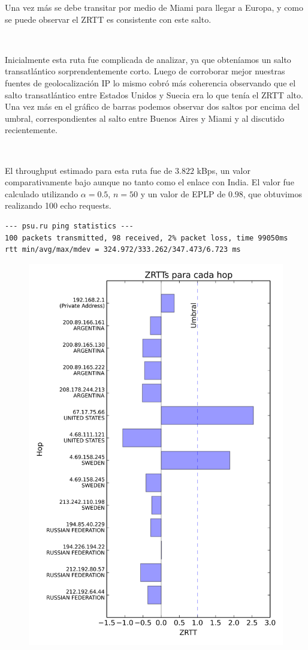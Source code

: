 Una vez más se debe transitar por medio de Miami para llegar a Europa, y como se puede observar el ZRTT es consistente con este salto. 

~

Inicialmente esta ruta fue complicada de analizar, ya que obteníamos un salto transatlántico sorprendentemente corto.
Luego de corroborar mejor nuestras fuentes de geolocalización IP lo mismo cobró más coherencia observando que el salto transatlántico entre Estados Unidos y Suecia era lo que tenía el ZRTT alto. Una vez más en el gráfico de barras podemos observar dos saltos por encima del umbral, correspondientes al salto entre Buenos Aires y Miami y al discutido recientemente.

~

El throughput estimado para esta ruta fue de $3.822$ kBps, un valor comparativamente bajo aunque no tanto como el enlace con India. El valor fue calculado utilizando $\alpha = 0.5$, $n = 50$ y un valor de EPLP de $0.98$, que obtuvimos realizando 100 echo requests.

\begin{verbatim}
--- psu.ru ping statistics ---
100 packets transmitted, 98 received, 2% packet loss, time 99050ms
rtt min/avg/max/mdev = 324.972/333.262/347.473/6.723 ms
\end{verbatim}

\begin{figure}[htp]
 \centering
  \includegraphics[scale=0.5]{imgs/perm.png}
\end{figure}

